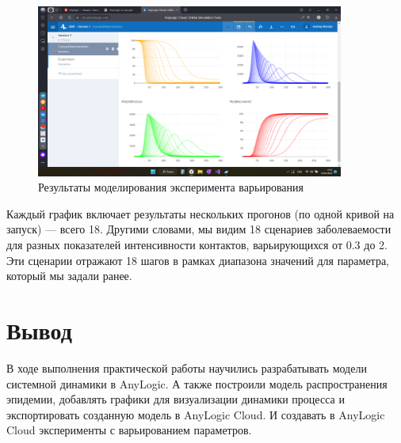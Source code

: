 \begin{figure}[h!tp]
	\centering
	\includegraphics[width=0.9\textwidth]{2023-03-18_17-15-46}
	\caption{Результаты моделирования эксперимента варьирования}
	\label{fig:anlg:confrun}
\end{figure}

Каждый график включает результаты нескольких прогонов (по одной кривой на
запуск) — всего 18. Другими словами, мы видим 18 сценариев заболеваемости
для разных показателей интенсивности контактов, варьирующихся от 0.3 до 2.
Эти сценарии отражают 18 шагов в рамках диапазона значений для параметра,
который мы задали ранее.

\clearpage

\section*{\LARGE Вывод}
В ходе выполнения практической работы научились разрабатывать модели
системной динамики в AnyLogic. А также построили модель распространения
эпидемии, добавлять графики для визуализации динамики процесса и
экспортировать созданную модель в AnyLogic Cloud. И создавать в
AnyLogic Cloud эксперименты с варьированием параметров.

